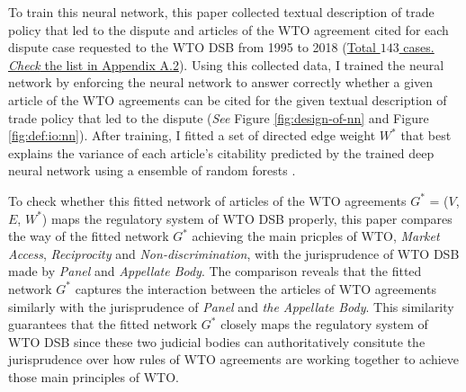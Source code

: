 
To train this neural network, this paper collected textual description of trade policy 
that led to the dispute and articles of the WTO agreement cited for each dispute
case requested to the WTO DSB 
from 1995 to 2018 (\hyperref[sub:cited-articles-table]{Total $143$ cases. \textit{Check} the list in Appendix A.2}).
Using this collected data, I trained the neural network by enforcing the neural network to answer correctly 
whether a given article of the WTO agreements
can be cited for the given textual description of 
trade policy that led to the dispute (\textit{See} Figure \ref{fig:design-of-nn} and Figure \ref{fig:def:io:nn}).
After training, I fitted a set of directed edge weight $W^*$ that 
best explains the variance of each article's citability predicted by the trained deep neural network using a ensemble of random forests \citep{rf, genie3}. 


To check whether this fitted network of articles of the WTO agreements $G^*$ = ($V$, $E$, $W^*$) maps the regulatory system of WTO DSB properly, this paper
compares the way of the fitted network $G^*$ achieving the main pricples of WTO, \textit{Market Access}, \textit{Reciprocity} and \textit{Non-discrimination}, 
with the jurisprudence of WTO DSB made by \textit{Panel} and \textit{Appellate Body}. The comparison reveals that the fitted network $G^*$ captures the interaction between the articles of WTO agreements
similarly with the jurisprudence of \textit{Panel} and \textit{the Appellate Body}. This similarity guarantees that the fitted network $G^*$ closely maps the regulatory system of WTO DSB since these two judicial bodies 
can authoritatively consitute the jurisprudence over how rules of WTO agreements are working together 
to achieve those main principles of WTO.

